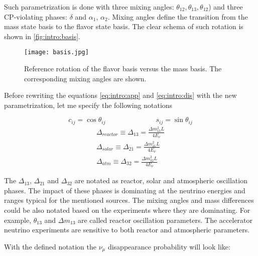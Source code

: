 \documentclass[../main.tex]{subfiles}
\begin{document}
Such parametrization is done with three mixing angles: $\theta_{12}, \theta_{13}, \theta_{12}$) and three CP-violating phases: $\delta$ and $\alpha_1$, $\alpha_2$. Mixing angles define the transition from the mass state basis to the flavor state basis. The clear schema of such rotation is shown in \autoref{fig:intro:basis}.

\begin{figure}[!ht]
  \centering
  \texttt{[image: basis.jpg]}
  \caption{Reference rotation of the flavor basis versus the mass basis. The corresponding mixing angles are shown.}
  \label{fig:intro:basis}
\end{figure}


Before rewriting the equations \ref{eq:intro:app} and \ref{eq:intro:dis} with the new parametrization, let me specify the following notations

\begin{equation}
c_{ij}=\cos\theta_{ij} \hspace{3cm} s_{ij}=\sin\theta_{ij}
\end{equation}
\begin{align}
\nonumber
\Delta_{reactor} \equiv \Delta_{13} = \frac{\Delta m^2_{13}L}{4E_\nu} \\
\Delta_{solar} \equiv \Delta_{21} = \frac{\Delta m^2_{21}L}{4E_\nu} \\
\Delta_{atm} \equiv\Delta_{32} = \frac{\Delta m^2_{32}L}{4E_\nu} \nonumber
\end{align}

The $\Delta_{13}$, $\Delta_{21}$ and $\Delta_{32}$ are notated as reactor, solar and atmospheric oscillation phases. The impact of these phases is dominating at the neutrino energies and ranges typical for the mentioned sources. The mixing angles and mass differences could be also notated based on the experiments where they are dominating. For example, $\theta_{13}$ and $\Delta m_{13}$ are called reactor oscillation parameters. The accelerator neutrino experiments are sensitive to both reactor and atmospheric parameters.

With the defined notation the $\nu_\mu$ disappearance probability will look like:
\end{document}
